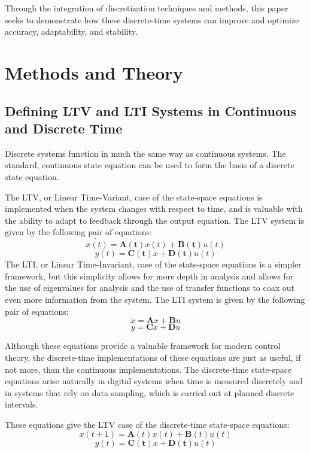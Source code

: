 \documentclass{article}
\begin{document}
Through the integration of discretization techniques and methods, this paper seeks to demonstrate how these discrete-time systems can improve and optimize accuracy, adaptability, and stability.

\section{Methods and Theory}
\subsection{Defining LTV and LTI Systems in Continuous and Discrete Time}
Discrete systems function in much the same way as continuous systems. The standard, continuous state equation can be used to form the basis of a discrete state equation. 

The LTV, or Linear Time-Variant, case of the state-space equations is implemented when the system changes with respect to time, and is valuable with the ability to adapt to feedback through the output equation. The LTV system is given by the following pair of equations:
\begin{equation}
    \dot{x(t)}=\bm{A(t)}x(t)+\bm{B(t)}u(t)
\end{equation}
\begin{equation}
    y(t)=\bm{C(t)}x+\bm{D(t)}u(t)
\end{equation}
The LTI, or Linear Time-Invariant, case of the state-space equations is a simpler framework, but this simplicity allows for more depth in analysis and allows for the use of eigenvalues for analysis and the use of transfer functions to coax out even more information from the system. The LTI system is given by the following pair of equations:
\begin{equation}
    \dot{x}=\bm{A}x+\bm{B}u
\end{equation}
\begin{equation}
    y=\bm{C}x+\bm{D}u
\end{equation}

Although these equations provide a valuable framework for modern control theory, the discrete-time implementations of these equations are just as useful, if not more, than the continuous implementations. The discrete-time state-space equations arise naturally in digital systems when time is measured discretely and in systems that rely on data sampling, which is carried out at planned discrete intervals.

These equations give the LTV case of the discrete-time state-space equations: 
\begin{equation}
    x(t+1)=\bm{A}(t)x(t)+\bm{B}(t)u(t)
\end{equation}
\begin{equation}
    y(t) = \bm{C(t)}x+\bm{D(t)}u(t)
\end{equation}
\end{document}
